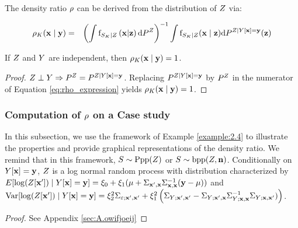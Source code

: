 \begin{property}
The density ratio $\rho$ can be derived from the distribution of $Z$ via:

\begin{eqnarray}\label{eq:rho_expression}
\rho_{K}(\mathbf{x}\mid\mathbf{y})&=&\left({\int
         \mathrm{f}_{S_K\mid Z}\left(\mathbf{x}|\mathbf{z}\right)\mathrm{d} P^{Z}}\right)^{-1}{\int\mathrm{f}_{S_K\mid Z}(\mathbf{x}\mid\mathbf{z})\mathrm{d} P^{Z\mid Y[\mathbf{x}]=\mathbf{y}}(\mathbf{z})}
\label{eq:oigjeogjio}\end{eqnarray}
\end{property}

\begin{property}\label{prop:indeprho}
If $Z$ and $Y$ are independent, then $\rho_K(\mathbf{x}\mid\mathbf{y})=1$.
\end{property}
\begin{proof}
$Z\perp Y\Rightarrow P^Z=P^{Z\mid Y[\mathbf{x}]=\mathbf{y}}$. Replacing $P^{Z\mid Y[\mathbf{x}]=\mathbf{y}}$ by $P^{Z}$ in the numerator of Equation \eqref{eq:rho_expression} yields  $\rho_K(\mathbf{x}\mid\mathbf{y})=1$.
\end{proof}

\subsubsection{Computation of $\rho$ on a Case study}
In this subsection, we use the framework of Example \ref{example:2.4} to illustrate the properties and provide graphical representations of the density ratio.
We remind that in this framework, $S\sim \mathrm{Ppp}(Z)$ or  $S\sim \mathrm{bpp}(Z,\mathbf{n})$.
Conditionally on $Y[\mathbf{x}]=\mathbf{y}$, $Z$ is a log normal random process with distribution characterized by 
$E[\log(Z[\mathbf{x}'])\mid Y[\mathbf{x}]=\mathbf{y}]=\xi_0+\xi_1(\mu+\Sigma_{\mathbf{x}',\mathbf{x}}\Sigma_{\mathbf{x},\mathbf{x}}^{-1} (\mathbf{y}-\mu))$ and 
$\mathrm{Var}[\log(Z[\mathbf{x}'])\mid Y[\mathbf{x}]=\mathbf{y}]=\xi_2^2\Sigma_{\varepsilon;\mathbf{x}',\mathbf{x}'}+\xi_1^2\left(\Sigma_{Y;\mathbf{x}',\mathbf{x}'}-\Sigma_{Y;\mathbf{x}',\mathbf{x}}\Sigma_{Y;\mathbf{x},\mathbf{x}}^{-1}\Sigma_{Y;\mathbf{x},\mathbf{x}'})\right)$.
\begin{proof}
See Appendix \ref{sec:A.owifjoeij}
\end{proof}

